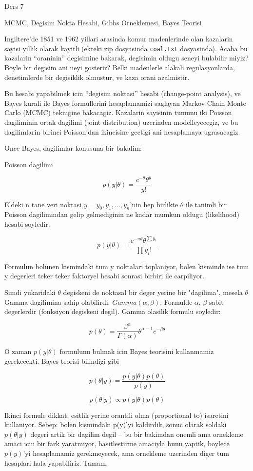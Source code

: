 \documentclass[12pt,fleqn]{article}\usepackage{../common}
\begin{document}
Ders 7

MCMC, Degisim Nokta Hesabi, Gibbs Orneklemesi, Bayes Teorisi

Ingiltere'de 1851 ve 1962 yillari arasinda komur madenlerinde olan
kazalarin sayisi yillik olarak kayitli (ekteki zip dosyasinda
\verb!coal.txt! dosyasinda). Acaba bu kazalarin ``oraninin'' degisimine
bakarak, degisimin oldugu seneyi bulabilir miyiz? Boyle bir degisim ani
neyi gosterir? Belki madenlerle alakali regulasyonlarda, denetimlerde bir
degisiklik olmustur, ve kaza orani azalmistir.

Bu hesabi yapabilmek icin ``degisim noktasi'' hesabi (change-point
analysis), ve Bayes kurali ile Bayes formullerini hesaplamamizi
saglayan Markov Chain Monte Carlo (MCMC) teknigine
bakacagiz. Kazalarin sayisinin tumunu iki Poisson dagiliminin
ortak dagilimi (joint distribution) uzerinden modelleyecegiz, ve bu
dagilimlarin birinci Poisson'dan ikincisine gectigi ani hesaplamaya
ugrasacagiz.

Once Bayes, dagilimlar konusuna bir bakalim:

Poisson dagilimi

\[ p(y|\theta) = \frac{e^{-\theta}\theta^y}{y!} \]

Eldeki n tane veri noktasi $y=y_0, y_1,...,y_n$'nin hep birlikte
$\theta$ ile tanimli bir Poisson dagilimindan gelip gelmediginin ne
kadar mumkun oldugu (likelihood) hesabi soyledir:

\[ p(y|\theta) = \frac{e^{-n\theta}\theta^{\sum y_i}}{\prod y_i!}  \]

Formulun bolunen kismindaki tum y noktalari toplaniyor, bolen kisminde
ise tum y degerleri teker teker faktoryel hesabi sonrasi birbiri ile
carpiliyor.

Simdi yukaridaki $\theta$ degiskeni de noktasal bir deger yerine bir
"dagilima", mesela $\theta$ Gamma dagilimina sahip olabilirdi:
$Gamma(\alpha, \beta)$. Formulde $\alpha$, $\beta$ sabit degerlerdir
(fonksiyon degiskeni degil). Gamma olasilik formulu soyledir:

\[ p(\theta) = \frac{\beta^\alpha}{\Gamma(\alpha)}\theta^{\alpha-1}e^{-\beta\theta} \]

O zaman $p(y|\theta)$ formulunu bulmak icin Bayes teorisini
kullanmamiz gerekecekti. Bayes teorisi bilindigi gibi

\[ p(\theta|y) = \frac{p(y|\theta)p(\theta)}{p(y)} \]

\[ p(\theta|y) \propto p(y|\theta)p(\theta) \]

Ikinci formule dikkat, esitlik yerine orantili olma (proportional to)
isaretini kullaniyor. Sebep: bolen kismindaki p(y)'yi kaldirdik, sonuc
olarak soldaki $p(\theta|y)$ degeri artik bir dagilim degil -- bu bir
bakimdan onemli ama ornekleme amaci icin bir fark yaratmiyor,
basitlestirme amaciyla bunu yaptik, boylece $p(y)$'yi hesaplamamiz
gerekmeyecek, ama ornekleme uzerinden diger tum hesaplari hala
yapabiliriz. Tamam.
\end{document}

